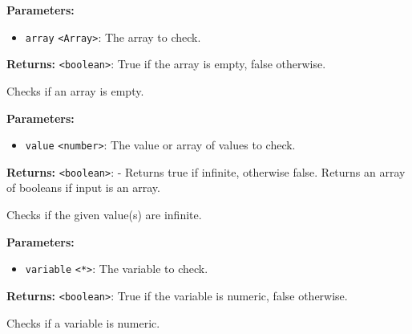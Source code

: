 \documentclass[12pt,a4paper]{article}
\begin{document}
\vspace{5mm}
\noindent {}


\noindent \textbf{Parameters:}
\begin{itemize}
  \item \texttt{array} \texttt{<Array>}: The array to check.
\end{itemize}

\noindent \textbf{Returns:} \texttt{<boolean>}: True if the array is empty, false otherwise.

\noindent Checks if an array is empty.

\vspace{5mm}
\noindent {}


\noindent \textbf{Parameters:}
\begin{itemize}
  \item \texttt{value} \texttt{<number>}: The value or array of values to check.
\end{itemize}

\noindent \textbf{Returns:} \texttt{<boolean>}: - Returns true if infinite, otherwise false. Returns an array of booleans if input is an array.

\noindent Checks if the given value(s) are infinite.

\vspace{5mm}
\noindent {}


\noindent \textbf{Parameters:}
\begin{itemize}
  \item \texttt{variable} \texttt{<*>}: The variable to check.
\end{itemize}

\noindent \textbf{Returns:} \texttt{<boolean>}: True if the variable is numeric, false otherwise.

\noindent Checks if a variable is numeric.

\vspace{5mm}
\noindent {}
\end{document}
